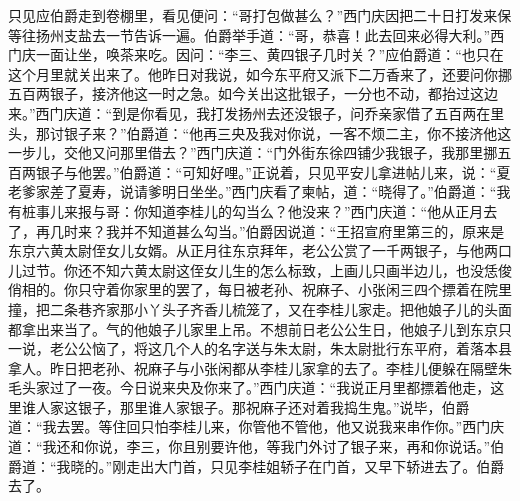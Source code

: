 只见应伯爵走到卷棚里，看见便问：“哥打包做甚么？”西门庆因把二十日打发来保等往扬州支盐去一节告诉一遍。伯爵举手道：“哥，恭喜！此去回来必得大利。”西门庆一面让坐，唤茶来吃。因问：“李三、黄四银子几时关？”应伯爵道：“也只在这个月里就关出来了。他昨日对我说，如今东平府又派下二万香来了，还要问你挪五百两银子，接济他这一时之急。如今关出这批银子，一分也不动，都抬过这边来。”西门庆道：“到是你看见，我打发扬州去还没银子，问乔亲家借了五百两在里头，那讨银子来？”伯爵道：“他再三央及我对你说，一客不烦二主，你不接济他这一步儿，交他又问那里借去？”西门庆道：“门外街东徐四铺少我银子，我那里挪五百两银子与他罢。”伯爵道：“可知好哩。”正说着，只见平安儿拿进帖儿来，说：“夏老爹家差了夏寿，说请爹明日坐坐。”西门庆看了柬帖，道：“晓得了。”伯爵道：“我有桩事儿来报与哥：你知道李桂儿的勾当么？他没来？”西门庆道：“他从正月去了，再几时来？我并不知道甚么勾当。”伯爵因说道：“王招宣府里第三的，原来是东京六黄太尉侄女儿女婿。从正月往东京拜年，老公公赏了一千两银子，与他两口儿过节。你还不知六黄太尉这侄女儿生的怎么标致，上画儿只画半边儿，也没恁俊俏相的。你只守着你家里的罢了，每日被老孙、祝麻子、小张闲三四个摽着在院里撞，把二条巷齐家那小丫头子齐香儿梳笼了，又在李桂儿家走。把他娘子儿的头面都拿出来当了。气的他娘子儿家里上吊。不想前日老公公生日，他娘子儿到东京只一说，老公公恼了，将这几个人的名字送与朱太尉，朱太尉批行东平府，着落本县拿人。昨日把老孙、祝麻子与小张闲都从李桂儿家拿的去了。李桂儿便躲在隔壁朱毛头家过了一夜。今日说来央及你来了。”西门庆道：“我说正月里都摽着他走，这里谁人家这银子，那里谁人家银子。那祝麻子还对着我捣生鬼。”说毕，伯爵道：“我去罢。等住回只怕李桂儿来，你管他不管他，他又说我来串作你。”西门庆道：“我还和你说，李三，你且别要许他，等我门外讨了银子来，再和你说话。”伯爵道：“我晓的。”刚走出大门首，只见李桂姐轿子在门首，又早下轿进去了。伯爵去了。

